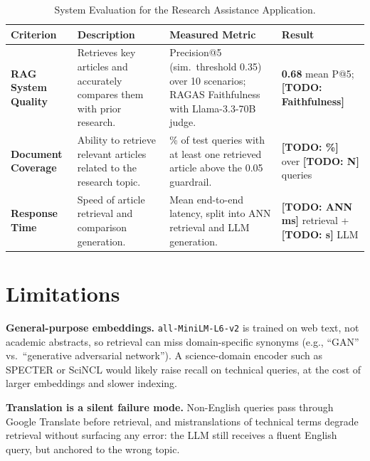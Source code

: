 \documentclass[conference]{IEEEtran}
\begin{document}
\begin{table}[htpb]
    \centering
    \caption{System Evaluation for the Research Assistance Application.}
    \label{tab:system_evaluation}
    \renewcommand{\arraystretch}{1.3} %
    \begin{tabularx}{\textwidth}{@{} l X l X @{}}
        \toprule
        \textbf{Criterion} & \textbf{Description} & \textbf{Measured Metric} & \textbf{Result} \\
        \midrule
        
        \textbf{RAG System Quality} &
        Retrieves key articles and accurately compares them with prior research. &
        Precision@5 (sim.\ threshold 0.35) over 10 scenarios; RAGAS Faithfulness with Llama-3.3-70B judge. &
        \textbf{0.68} mean P@5; \textbf{[TODO: Faithfulness]} \\

        \textbf{Document Coverage} &
        Ability to retrieve relevant articles related to the research topic. &
        \% of test queries with at least one retrieved article above the 0.05 guardrail. &
        \textbf{[TODO: \%]} over \textbf{[TODO: N]} queries \\

        \textbf{Response Time} &
        Speed of article retrieval and comparison generation. &
        Mean end-to-end latency, split into ANN retrieval and LLM generation. &
        \textbf{[TODO: ANN ms]} retrieval + \textbf{[TODO: s]} LLM \\
        
        \bottomrule
    \end{tabularx}
\end{table}

\section{Limitations}

\textbf{General-purpose embeddings.} \texttt{all-MiniLM-L6-v2} is trained on web text, not academic abstracts, so retrieval can miss domain-specific synonyms (e.g., ``GAN'' vs.\ ``generative adversarial network''). A science-domain encoder such as SPECTER or SciNCL would likely raise recall on technical queries, at the cost of larger embeddings and slower indexing.

\textbf{Translation is a silent failure mode.} Non-English queries pass through Google Translate before retrieval, and mistranslations of technical terms degrade retrieval without surfacing any error: the LLM still receives a fluent English query, but anchored to the wrong topic.
\end{document}
